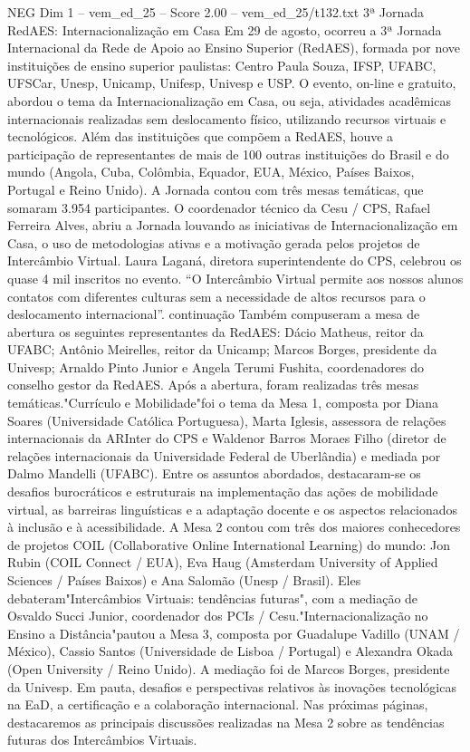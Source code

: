 \begin{textsample}{NEG Dim 1 – vem\_ed\_25 – Score 2.00 – vem\_ed\_25/t132.txt}  \label{ex:f1_neg_080}
3ª Jornada RedAES: Internacionalização em Casa Em 29 de agosto, ocorreu a 3ª Jornada Internacional da Rede de Apoio ao Ensino Superior (RedAES), formada por nove instituições de ensino superior paulistas: Centro Paula Souza, IFSP, UFABC, UFSCar, Unesp, Unicamp, Unifesp, Univesp e USP.
O evento, on-line e gratuito, abordou o tema da Internacionalização em Casa, ou seja, atividades acadêmicas internacionais realizadas sem deslocamento físico, utilizando recursos virtuais e tecnológicos.
Além das instituições que compõem a RedAES, houve a participação de representantes de mais de 100 outras instituições do Brasil e do mundo (Angola, Cuba, Colômbia, Equador, EUA, México, Países Baixos, Portugal e Reino Unido).
A Jornada contou com três mesas temáticas, que somaram 3.954 participantes.
O coordenador técnico da Cesu / CPS, Rafael Ferreira Alves, abriu a Jornada louvando as iniciativas de Internacionalização em Casa, o uso de metodologias ativas e a motivação gerada pelos projetos de Intercâmbio Virtual.
Laura Laganá, diretora superintendente do CPS, celebrou os quase 4 mil inscritos no evento. “O Intercâmbio Virtual permite aos nossos alunos contatos com diferentes culturas sem a necessidade de altos recursos para o deslocamento internacional”. continuação Também compuseram a mesa de abertura os seguintes representantes da RedAES: Dácio Matheus, reitor da UFABC; Antônio Meirelles, reitor da Unicamp; Marcos Borges, presidente da Univesp; Arnaldo Pinto Junior e Angela Terumi Fushita, coordenadores do conselho gestor da RedAES.
Após a abertura, foram realizadas três mesas temáticas."Currículo e Mobilidade"foi o tema da Mesa 1, composta por Diana Soares (Universidade Católica Portuguesa), Marta Iglesis, assessora de relações internacionais da ARInter do CPS e Waldenor Barros Moraes Filho (diretor de relações internacionais da Universidade Federal de Uberlândia) e mediada por Dalmo Mandelli (UFABC).
Entre os assuntos abordados, destacaram-se os desafios burocráticos e estruturais na implementação das ações de mobilidade virtual, as barreiras linguísticas e a adaptação docente e os aspectos relacionados à inclusão e à acessibilidade.
A Mesa 2 contou com três dos maiores conhecedores de projetos COIL (Collaborative Online International Learning) do mundo: Jon Rubin (COIL Connect / EUA), Eva Haug (Amsterdam University of Applied Sciences / Países Baixos) e Ana Salomão (Unesp / Brasil).
Eles debateram"Intercâmbios Virtuais: tendências futuras", com a mediação de Osvaldo Succi Junior, coordenador dos PCIs / Cesu."Internacionalização no Ensino a Distância"pautou a Mesa 3, composta por Guadalupe Vadillo (UNAM / México), Cassio Santos (Universidade de Lisboa / Portugal) e Alexandra Okada (Open University / Reino Unido).
A mediação foi de Marcos Borges, presidente da Univesp.
Em pauta, desafios e perspectivas relativos às inovações tecnológicas na EaD, a certificação e a colaboração internacional.
Nas próximas páginas, destacaremos as principais discussões realizadas na Mesa 2 sobre as tendências futuras dos Intercâmbios Virtuais.

\end{textsample}
